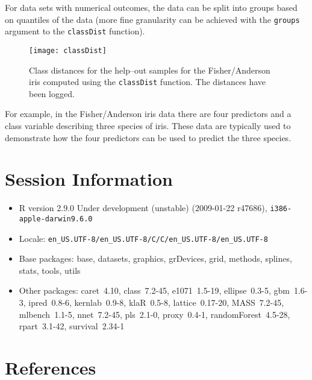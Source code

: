 \documentclass[12pt]{article}
\begin{document}
For data sets with numerical outcomes, the data can be split into groups based on quantiles of the data (more fine granularity can be achieved with the \texttt{groups} argument to the \texttt{classDist} function).

\begin{figure}
   \begin{center}		
      \texttt{[image: classDist]}
      \caption{Class distances for the help--out samples for the Fisher/Anderson iris computed using the \texttt{classDist} function. The distances have been logged.}
      \label{F:classDist} 
    \end{center}
\end{figure} 

For example, in the Fisher/Anderson iris data there are four predictors and a class variable describing three species of iris. These data are typically used to demonstrate how the four predictors can be used to predict the three species. 


\section{Session Information}

\begin{itemize}
  \item R version 2.9.0 Under development (unstable) (2009-01-22 r47686), \verb|i386-apple-darwin9.6.0|
  \item Locale: \verb|en_US.UTF-8/en_US.UTF-8/C/C/en_US.UTF-8/en_US.UTF-8|
  \item Base packages: base, datasets, graphics, grDevices, grid,
    methods, splines, stats, tools, utils
  \item Other packages: caret~4.10, class~7.2-45, e1071~1.5-19,
    ellipse~0.3-5, gbm~1.6-3, ipred~0.8-6, kernlab~0.9-8, klaR~0.5-8,
    lattice~0.17-20, MASS~7.2-45, mlbench~1.1-5, nnet~7.2-45,
    pls~2.1-0, proxy~0.4-1, randomForest~4.5-28, rpart~3.1-42,
    survival~2.34-1
\end{itemize}
\section{References}
\end{document}
